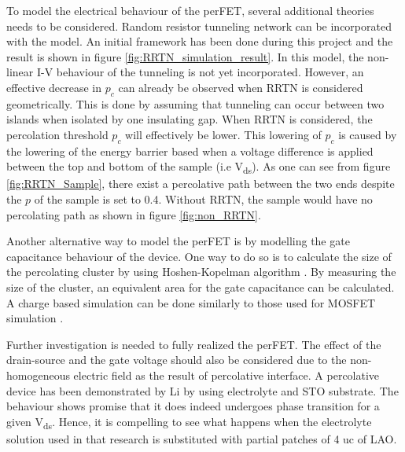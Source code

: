 \documentclass[11pt,a4paper]{report}
\begin{document}
To model the electrical behaviour of the perFET, several additional theories needs to be considered. Random resistor tunneling network can be incorporated with the model. An initial framework has been done during this project and the result is shown in figure \ref{fig:RRTN_simulation_result}. In this model, the non-linear I-V behaviour of the tunneling is not yet incorporated. However, an effective decrease in $p_c$ can already be observed when RRTN is considered geometrically. This is done by assuming that tunneling can occur between two islands when isolated by one insulating gap. When RRTN is considered, the percolation threshold $p_c$ will effectively be lower. This lowering of $p_c$ is caused by the lowering of the energy barrier based when a voltage difference is applied between the top and bottom of the sample (i.e V\textsubscript{ds}). As one can see from figure \ref{fig:RRTN_Sample}, there exist a percolative path between the two ends despite the $p$ of the sample is set to 0.4. Without RRTN, the sample would have no percolating path as shown in figure \ref{fig:non_RRTN}.

Another alternative way to model the perFET is by modelling the gate capacitance behaviour of the device. One way to do so is to calculate the size of the percolating cluster by using Hoshen-Kopelman algorithm \cite{percolation_simulation}. By measuring the size of the cluster, an equivalent area for the gate capacitance can be calculated. A charge based simulation can be done similarly to those used for MOSFET simulation \cite{Semiconductor_explained_more}.

Further investigation is needed to fully realized the perFET. The effect of the drain-source and the gate voltage should also be considered due to the non-homogeneous electric field as the result of percolative interface. A percolative device has been demonstrated by Li \cite{li_graf_schladt_jiang_parkin_2012} by using electrolyte and STO substrate. The behaviour shows promise that it does indeed undergoes phase transition for a given V\textsubscript{ds}. Hence, it is compelling to see what happens when the electrolyte solution used in that research is substituted with partial patches of 4 uc of LAO.
\end{document}
